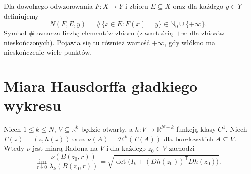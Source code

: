 \begin{definicja}
\label{def:multiplicity-28}
Dla dowolnego odwzorowania $F:X\to Y$
i zbioru $E\subseteq X$ oraz dla każdego $y\in Y$ definiujemy
\[
 N(F,E,y)=\#\{x\in E:F(x)=y\}\in\mathbb N_0\cup\{+\infty\}.
\]
Symbol $\#$ oznacza liczbę elementów zbioru
(z wartością $+\infty$ dla zbiorów nieskończonych).
Pojawia się tu również wartość $+\infty$,
gdy włókno ma nieskończenie wiele punktów.
\end{definicja}

\section{Miara Hausdorffa gładkiego wykresu}
\begin{lemat}
\label{lem:graph-hausdorff-28}
Niech $1\le k\le N$, $V\subseteq\mathbb R^k$ będzie otwarty,
a $h:V\to\mathbb R^{N-k}$ funkcją klasy $C^1$.
Niech $\Gamma(z)=(z,h(z))$ oraz
$\nu(A)=\mathcal H^k(\Gamma(A))$
dla borelowskich $A\subseteq V$. Wtedy $\nu$
jest miarą Radona na $V$ i dla każdego
$z_0\in V$ zachodzi
\[
 \lim_{r\downarrow0}
 \frac{\nu(B(z_0,r))}{\lambda_k(B(z_0,r))}
 =\sqrt{\det\bigl(I_k+(Dh(z_0))^{\mathsf T}Dh(z_0)\bigr)}.
\]
\end{lemat}
